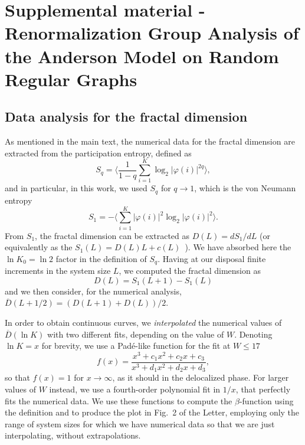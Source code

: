 \documentclass[reprint,aps,prl,superscriptaddress,english,nolongbibliography]{revtex4-2}
\begin{document}
{


\pagebreak
\widetext
\newpage


\section{Supplemental material - Renormalization Group Analysis of the Anderson Model on Random Regular Graphs}



\subsection{Data analysis for the fractal dimension}

As mentioned in the main text, the numerical data for the fractal dimension are extracted from the participation entropy, defined as
\begin{equation}
    S_q = \Big\langle \frac{1}{1-q} \sum_{i=1}^{K} \log_2 |\varphi(i)|^{2q} \Big\rangle,
\end{equation}
and in particular, in this work, we used $S_q$ for $q\to 1$, which is the von Neumann entropy
\begin{equation}
\label{eq:vonNeumann}
    S_1 = - \Big \langle \sum_{i=1}^{K}  |\varphi(i)|^{2} \log_2 |\varphi(i)|^{2} \Big\rangle.
\end{equation}
From $S_1$, the fractal dimension can be extracted as $D(L)=d S_1 /dL$ (or equivalently as the $S_1(L) = D(L)L + c(L)$~\cite{sierant2023universality}). We have absorbed here the $\ln K_0 = \ln 2$ factor in the definition of $S_q$.
Having at our disposal finite increments in the system size $L$, we computed the fractal dimension as
\begin{equation}
    D(L) = S_1(L+1)-S_1(L)
\end{equation}
and we then consider, for the numerical analysis, $\overline{D}(L+1/2) = (D(L+1)+D(L))/2$.

In order to obtain continuous curves, we \emph{interpolated} the numerical values of $\overline{D}(\ln K)$ with two different fits, depending on the value of $W$. Denoting $\ln K=x$ for brevity, we use a Pad\'e-like function for the fit at $W\leq 17$  
\begin{equation}
    f(x) = \frac{x^3 + c_1 x^2 + c_2 x + c_3}{x^3 + d_1 x^2 + d_2 x + d_3},
\end{equation}
so that $f(x)=1$ for $x \to \infty$, as it should in the delocalized phase. For larger values of $W$ instead, we use a fourth-order polynomial fit in $1/x$, that perfectly fits the numerical data. We use these functions to compute the $\beta$-function using the definition and to produce the plot in Fig.~2 of the Letter, employing only the range of system sizes for which we have numerical data so that we are just interpolating, without extrapolations.

}
\end{document}
